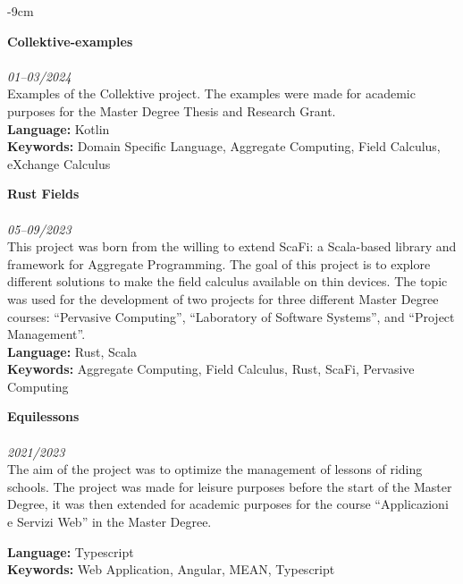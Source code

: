 \documentclass[10pt,a4paper]{altacv}
\begin{document}
\begin{adjustwidth}{}{-9cm}
    \divider

    \textbf{Collektive-examples}\\
    \\
    \textit{01--03/2024}\\ \smallskip
    Examples of the Collektive project. The examples were made for academic purposes for the Master Degree Thesis and Research Grant.\\ \smallskip
    \smallskip
    \textbf{Language:} Kotlin\\
    \textbf{Keywords:} Domain Specific Language, Aggregate Computing, Field Calculus, eXchange Calculus

    \divider

    \textbf{Rust Fields}\\
    \\
    \textit{05--09/2023}\\ \smallskip
    This project was born from the willing to extend ScaFi: a Scala-based library and framework for Aggregate Programming.
    The goal of this project is to explore different solutions to make the field calculus available on thin devices.
    The topic was used for the development of two projects for three different Master Degree courses: ``Pervasive Computing'',
    ``Laboratory of Software Systems'', and ``Project Management''.\\ \smallskip
    \textbf{Language:} Rust, Scala\\
    \textbf{Keywords:} Aggregate Computing, Field Calculus, Rust, ScaFi, Pervasive Computing

    \divider

    \textbf{Equilessons}\\
    \\
    \textit{2021/2023}\\ \smallskip
    The aim of the project was to optimize the management of lessons of riding schools.
    The project was made for leisure purposes before the start of the Master Degree, it was then extended for academic purposes for the course ``Applicazioni e Servizi Web'' in the Master Degree.\\ \smallskip
    \smallskip

    \textbf{Language:} Typescript\\
    \textbf{Keywords:} Web Application, Angular, MEAN, Typescript


\end{adjustwidth}
\end{document}
